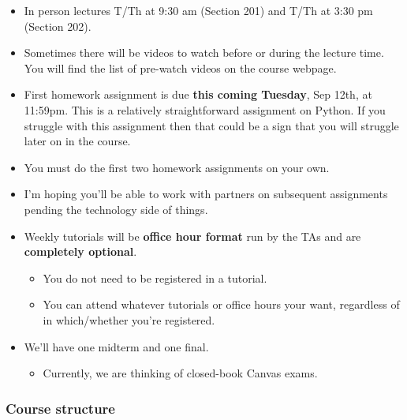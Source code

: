 \documentclass[11pt]{article}
\providecommand{\tightlist}{%
      \setlength{\itemsep}{0pt}\setlength{\parskip}{0pt}}
\begin{document}
\begin{itemize}
\tightlist
\item
  In person lectures T/Th at 9:30 am (Section 201) and T/Th at 3:30 pm
  (Section 202).
\item
  Sometimes there will be videos to watch before or during the lecture
  time. You will find the list of pre-watch videos on the course
  webpage.
\item
  First homework assignment is due \textbf{this coming Tuesday}, Sep
  12th, at 11:59pm. This is a relatively straightforward assignment on
  Python. If you struggle with this assignment then that could be a sign
  that you will struggle later on in the course.\\
\item
  You must do the first two homework assignments on your own.
\item
  I'm hoping you'll be able to work with partners on subsequent
  assignments pending the technology side of things.
\item
  Weekly tutorials will be \textbf{office hour format} run by the TAs
  and are \textbf{completely optional}.

  \begin{itemize}
  \tightlist
  \item
    You do not need to be registered in a tutorial.
  \item
    You can attend whatever tutorials or office hours your want,
    regardless of in which/whether you're registered.
  \end{itemize}
\item
  We'll have one midterm and one final.

  \begin{itemize}
  \tightlist
  \item
    Currently, we are thinking of closed-book Canvas exams.
  \end{itemize}
\end{itemize}

    \subsubsection{Course structure}\label{course-structure}
\end{document}
